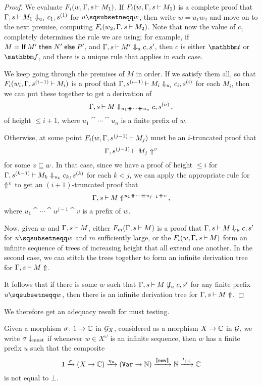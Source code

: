 \documentclass{article}
\begin{document}
\begin{proof}
  We evaluate $F_i(w,\Gamma,s\mathbin{\vdash} M_1)$.  
  If $F_i(w,\Gamma,s\mathbin{\vdash} M_1)$ is a complete proof that $\Gamma,s\mathbin{\vdash} M_1 \Downarrow_{u_1} c_1,s^{(1)}$ for $u\pprefix w$, then write $w=u_1w_2$ and move on to the next premise, computing $F_i(w_2,\Gamma,s\mathbin{\vdash} M_2)$.  
  Note that now the value of $c_1$ completely determines the \IAX rule we are using; for example, if $M=\operatorname{\mathsf{If}} M' \mathrel{\mathsf{then}} N' \mathrel{\mathsf{else}} P'$, and $\Gamma,s\mathbin{\vdash} M' \Downarrow_{u} c,s'$, then $c$ is either $\true$ or $\false$, and there is a unique \IAX rule that applies in each case.

  We keep going through the premises of $M$ in order.  
  If we satisfy them all, so that $F_i(w_i,\Gamma,s^{(i-1)} \mathbin{\vdash} M_i)$ is a proof that $\Gamma,s^{(i-1)} \mathbin{\vdash} M_i \Downarrow_{u_i} c_i,s^{(i)}$ for each $M_i$, then we can put these together to get a derivation of
  \[
    \Gamma,s \mathbin{\vdash} M\Downarrow_{u_1\mathbin{+\mkern-10mu+} \cdots \mathbin{+\mkern-10mu+} u_n} c,s^{(n)}\,,
    \]
  of height $\le i+1$, where $u_1\cat \cdots \cat u_n$ is a finite prefix of $w$.
  
  Otherwise, at some point $F_i(w,\Gamma,s^{(j-1)}\mathbin{\vdash} M_j)$ must be an $i$-truncated proof that
  \[
    \Gamma,s^{(j-1)}\mathbin{\vdash} M_j\Uparrow^v
    \]
  for some $v\sqsubseteq w$.
  In that case, since we have a proof of height $\le i$ for $\Gamma,s^{(k-1)}\mathbin{\vdash} M_k \Downarrow_{u_k} c_k,s^{(k)}$ for each $k<j$, we can apply the appropriate rule for $\Uparrow^v$ to get an $(i+1)$-truncated proof that
  \[
    \Gamma,s\mathbin{\vdash} M\Uparrow^{u_1\mathbin{+\mkern-10mu+} \cdots \mathbin{+\mkern-10mu+} u_{j-1} \mathbin{+\mkern-10mu+} v}\,,
    \]
  where $u_1\cat \cdots \cat u^{j-1} \cat v$ is a prefix of $w$.

  Now, given $w$ and $\Gamma,s\mathbin{\vdash} M$, either $F_m(\Gamma,s\mathbin{\vdash} M)$ is a proof that $\Gamma,s\mathbin{\vdash} M\Downarrow_u c,s'$ for $u\pprefix w$ and $m$ sufficiently large, or the $F_i(w,\Gamma,s\mathbin{\vdash} M)$ form an infinite sequence of trees of increasing height that all extend one another.  
  In the second case, we can stitch the trees together to form an infinite derivation tree for $\Gamma,s\mathbin{\vdash} M\Uparrow$.

  It follows that if there is some $w$ such that $\Gamma,s\mathbin{\vdash} M\not\Downarrow_u c,s'$ for any finite prefix $u\pprefix w$, then there is an infinite derivation tree for $\Gamma,s\mathbin{\vdash} M\Uparrow$.
\end{proof}

We therefore get an adequacy result for must testing.

\begin{definition}
  Given a morphism $\sigma\colon 1\to\mathbb{C}$ in $\mathcal G_X$, considered as a morphism $X \to \mathbb{C}$ in $\mathcal G$, we write $\sigma\downarrow_{\operatorname{must}}$ if whenever $w\in X^\omega$ is an infinite sequence, then $w$ has a finite prefix $u$ such that the composite
  \[
    1 \xrightarrow{\sigma}
    (X \to \mathbb{C}) \xrightarrow{\eta_u}
    ({\mathtt{Var}} \to \mathbb{N}) \xrightarrow{\left\llbracket\operatorname{{\mathsf{new}}}\right\rrbracket}
    \mathbb{N} \xrightarrow{t_{|u|}}
    \mathbb{C}
    \]
  is not equal to $\bot$.
\end{definition}
\end{document}

